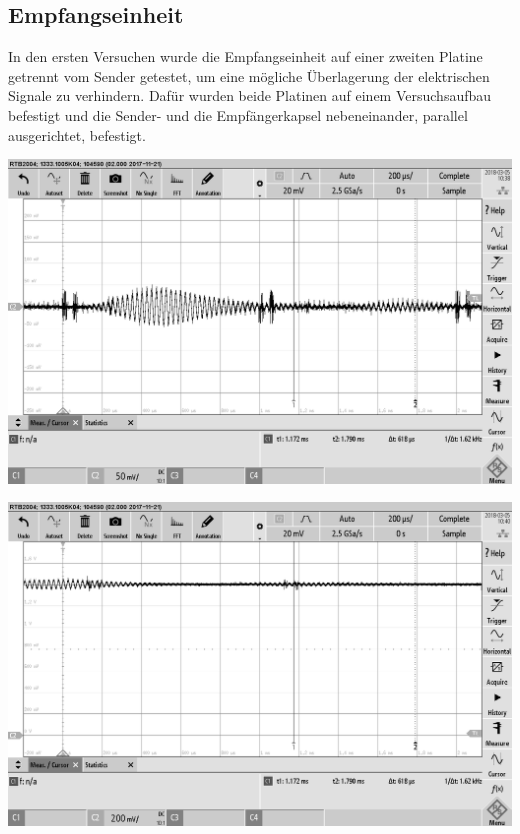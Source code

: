 \subsection{Empfangseinheit}
In den ersten Versuchen wurde die Empfangseinheit auf einer zweiten Platine getrennt vom Sender getestet, um eine mögliche Überlagerung der elektrischen Signale zu verhindern. Dafür wurden beide Platinen auf einem Versuchsaufbau befestigt und die Sender- und die Empfängerkapsel nebeneinander, parallel ausgerichtet, befestigt.\\
\begin{minipage}{0.5\textwidth}
\includegraphics[width=1\textwidth, draft
]{Abbildungen/MessungenP1/Signal-Empfang.png}
\label{fig:Empfang am LS}
\end{minipage}
\begin{minipage}{0.5\textwidth}
\includegraphics[width=1\textwidth, draft
]{Abbildungen/MessungenP1/Signal-nach-der-Filterung.png}
\label{fig:Filterung}
\end{minipage}
